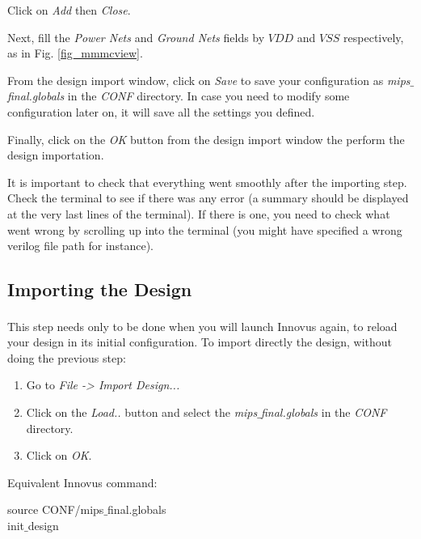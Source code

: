 \begin{enumerate}
{\item Click on \textit{Add} then \textit{Close}. 
}
\clearpage
	\item Next, fill the \textit{Power Nets} and \textit{Ground Nets} fields by $VDD$ and $VSS$ respectively, as in Fig. \ref{fig_mmmcview}.
	\item From the design import window, click on \textit{Save} to save your configuration as \textit{mips$\_$final.globals} in the \textit{CONF} directory. In case you need to modify some configuration later on, it will save all the settings you defined.
\item Finally, click on the \textit{OK} button from the design import window the perform the design importation.
		\vspace{-6mm}
\begin{remark}
	It is important to check that everything went smoothly after the importing step. Check the terminal to see if there was any error (a summary should be displayed at the very last lines of the terminal). If there is one, you need to check what went wrong by scrolling up into the terminal (you might have specified a wrong verilog file path for instance).
\end{remark}
	\vspace{-4mm}
\end{enumerate}

\subsection{Importing the Design}

This step needs only to be done when you will launch Innovus\textsuperscript{\tiny\textregistered} again, to reload your design in its initial configuration. To import directly the design, without doing the previous step:
 \begin{enumerate}
	\item Go to \textit{File -> Import Design...}
	\item Click on the \textit{Load..} button and select the \textit{mips$\_$final.globals} in the \textit{CONF} directory.
	\item Click on \textit{OK}.
\end{enumerate}


Equivalent Innovus command:
	\begin{codeline}
source CONF/mips$\_$final.globals \\
init$\_$design
\end{codeline}



